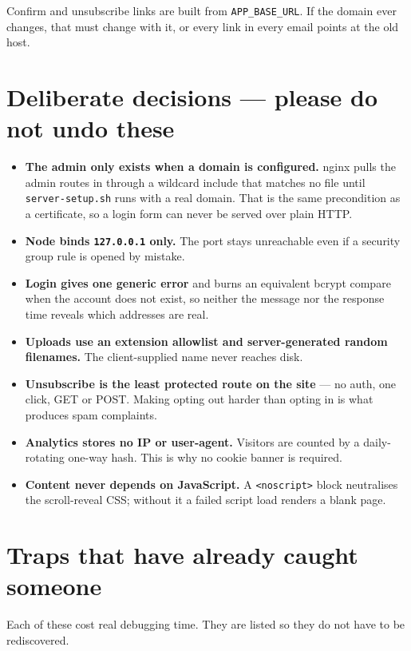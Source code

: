 \documentclass[11pt,a4paper]{article}
\newcommand{\lead}[1]{\textbf{\color{ink}#1}}
\newcommand{\code}[1]{\texttt{\small #1}}
\begin{document}
Confirm and unsubscribe links are built from \code{APP\_BASE\_URL}. If the
domain ever changes, that must change with it, or every link in every email
points at the old host.

\section{Deliberate decisions --- please do not undo these}

\begin{itemize}
  \item \lead{The admin only exists when a domain is configured.} nginx pulls
        the admin routes in through a wildcard include that matches no file
        until \code{server-setup.sh} runs with a real domain. That is the same
        precondition as a certificate, so a login form can never be served
        over plain HTTP.
  \item \lead{Node binds \code{127.0.0.1} only.} The port stays unreachable
        even if a security group rule is opened by mistake.
  \item \lead{Login gives one generic error} and burns an equivalent bcrypt
        compare when the account does not exist, so neither the message nor
        the response time reveals which addresses are real.
  \item \lead{Uploads use an extension allowlist and server-generated random
        filenames.} The client-supplied name never reaches disk.
  \item \lead{Unsubscribe is the least protected route on the site} --- no
        auth, one click, GET or POST. Making opting out harder than opting in
        is what produces spam complaints.
  \item \lead{Analytics stores no IP or user-agent.} Visitors are counted by a
        daily-rotating one-way hash. This is why no cookie banner is required.
  \item \lead{Content never depends on JavaScript.} A \code{<noscript>} block
        neutralises the scroll-reveal CSS; without it a failed script load
        renders a blank page.
\end{itemize}

\section{Traps that have already caught someone}

Each of these cost real debugging time. They are listed so they do not have to
be rediscovered.
\end{document}
